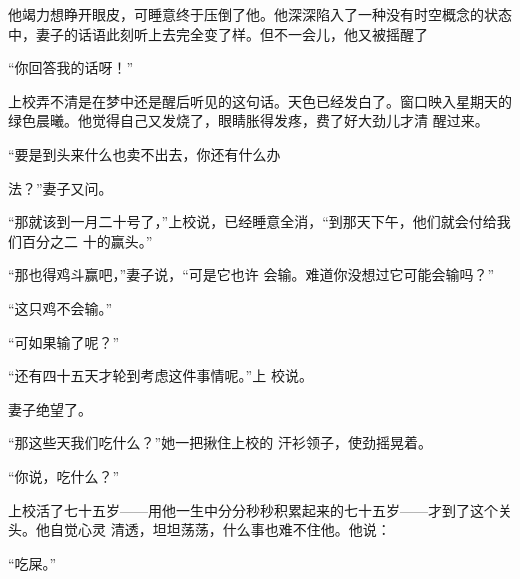 \documentclass{article}
\begin{document}
他竭力想睁开眼皮，可睡意终于压倒了他。他深深陷入了一种没有时空概念的状态中，妻子的话语此刻听上去完全变了样。但不一会儿，他又被摇醒了


“你回答我的话呀！” 

上校弄不清是在梦中还是醒后听见的这句话。天色已经发白了。窗口映入星期天的绿色晨曦。他觉得自己又发烧了，眼睛胀得发疼，费了好大劲儿才清
醒过来。 

“要是到头来什么也卖不出去，你还有什么办
\newpage

法？”妻子又问。 

“那就该到一月二十号了，”上校说，已经睡意全消，“到那天下午，他们就会付给我们百分之二
十的赢头。” 

“那也得鸡斗赢吧，”妻子说，“可是它也许
会输。难道你没想过它可能会输吗？” 


“这只鸡不会输。” 


“可如果输了呢？” 

“还有四十五天才轮到考虑这件事情呢。”上
校说。 


妻子绝望了。 

“那这些天我们吃什么？”她一把揪住上校的
汗衫领子，使劲摇晃着。 

\newpage


“你说，吃什么？” 

上校活了七十五岁——用他一生中分分秒秒积累起来的七十五岁——才到了这个关头。他自觉心灵
清透，坦坦荡荡，什么事也难不住他。他说： 

“吃屎。”
\end{document}
